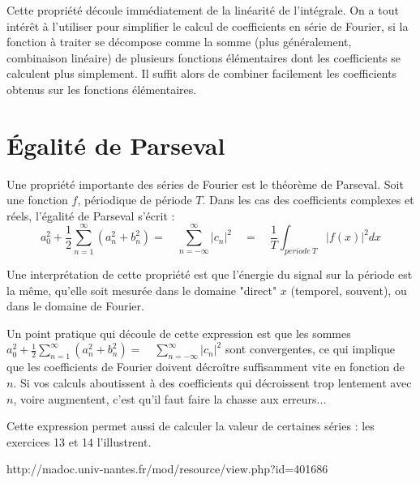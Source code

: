 Cette propriété découle immédiatement de la linéarité de l'intégrale. On a tout intérêt à l'utiliser pour simplifier le calcul de coefficients en série de Fourier,  si la fonction à traiter se décompose comme la somme (plus généralement, combinaison linéaire) de plusieurs fonctions élémentaires dont les coefficients se calculent plus simplement. Il suffit alors de combiner facilement les coefficients obtenus sur les fonctions élémentaires.

\section{Égalité de Parseval}

Une propriété importante des séries de Fourier est le théorème de
Parseval. Soit une fonction $f$, périodique de période $T$. Dans les cas des coefficients complexes et réels, l'égalité de Parseval s'écrit :
\begin{equation}
a_0^2+\frac{1}{2}\sum_{n=1}^\infty (a_n^2+b_n^2)=\quad \sum_{n=-\infty}^\infty | c_n|^2 \quad=\quad \frac{1}{T}\int_{periode~T}|f(x)|^2 dx
\end{equation}

Une interprétation de cette propriété est que l'énergie du signal sur la période est la même, qu'elle soit mesurée dans le domaine "direct" $x$ (temporel, souvent), ou dans le domaine de Fourier. 

Un point pratique qui découle de cette expression est que les sommes $a_0^2 + \frac{1}{2}\sum_{n=1}^\infty (a_n^2+b_n^2)=\quad\sum_{n=-\infty}^\infty | c_n|^2 $ sont convergentes, ce qui implique que les coefficients de Fourier doivent décroître suffisamment vite en fonction de $n$. Si vos calculs aboutissent à des coefficients qui décroissent trop lentement avec $n$, voire augmentent, c'est qu'il faut faire la chasse aux erreurs...

Cette expression permet aussi de calculer la valeur de certaines séries : les exercices 13 et 14 l'illustrent.


http://madoc.univ-nantes.fr/mod/resource/view.php?id=401686


